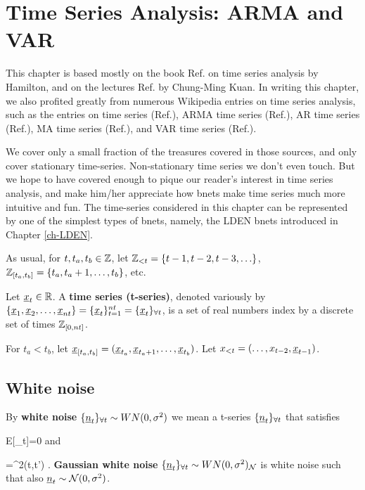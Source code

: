 \chapter{Time Series Analysis:
ARMA and VAR}\label{ch-time-arma}



This chapter is based mostly
on the book  Ref.\cite{hamilton2020time}
on time series analysis by Hamilton,
and on the lectures Ref. \cite{t-series-kuan}
by Chung-Ming Kuan.
In writing this chapter, we also profited greatly
from numerous Wikipedia entries on time series
analysis,
such as  the entries
on
time series (Ref.\cite{wiki-time-series}),
ARMA time series (Ref.\cite{wiki-ARMA}),
AR time series (Ref.\cite{wiki-AR}),
MA time series (Ref.\cite{wiki-MA}), and
VAR time series (Ref.\cite{wiki-VAR}).



We cover only a small fraction
 of the  treasures
covered in those sources,
and only
cover stationary
time-series. Non-stationary
time series
we don't even touch.
But we hope to have covered
enough to pique
our reader's interest in time series analysis,
and make him/her appreciate
how bnets make
 time series much more
intuitive and fun.
The time-series
considered in this chapter
can
be represented
by one of the
simplest
types of
bnets, namely, the LDEN bnets
introduced in
Chapter \ref{ch-LDEN}.



As usual, for $t, t_a, t_b\in {\mathbb{Z}}$,
 let
 ${\mathbb{Z}}_{<t}=
\{t-1, t-2, t-3, \ldots\}$,
${\mathbb{Z}}_{[t_a, t_b]}=\{t_a, t_a+1,
\ldots, t_b\}$, etc.

Let $\rvx_t\in \RR$.
A
{\bf time series (t-series)},
denoted variously by
$\{\rvx_1, \rvx_2, \ldots,
\rvx_{nt}\}
=\{\rvx_t\}_{t=1}^{nt}
=\tseries{\rvx_t}$,
is a set of real numbers
index by a discrete set of times
${\mathbb{Z}}_{[0, nt]}$.


For $t_a<t_b$, let
$\rvx_{[t_a, t_b]}=(\rvx_{t_a},
\rvx_{t_a+1},
 \ldots, \rvx_{t_b})$.
Let $x_{<t}=(\ldots, x_{t-2}, \rvx_{t-1})$.

\section{White noise}

By {\bf white noise}
$\tseries{\rvn_t}\sim  WN(0, \s^2)$
we mean a t-series $\tseries{\rvn_t}$
that satisfies

\beq
E[\rvn_t]=0
\eeq
and

\beq
{}=\s^2\delta(t,t')
\;.
\eeq
{\bf Gaussian white noise}
$\tseries{\rvn_t}\sim WN(0, \s^2)_\caln$
is white noise such that also
$\rvn_t\sim \caln(0, \s^2)$.

